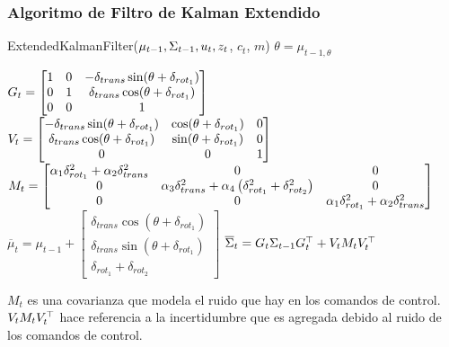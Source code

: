 \begin{frame}
	\frametitle{Algoritmo de Filtro de Kalman Extendido}
    \footnotesize
 	\begin{algorithmic}[1]
		\State ExtendedKalmanFilter({$\mu_{t-1}, \Sigma_{t-1}, u_{t}, z_{t}$, $c_{t}$, $m$})
		\State $\theta = \mu_{t-1,\theta}$
		
		\State $
			G_{t} = 
			\begin{bmatrix}
				1 & 0 & -\delta_{trans} \sin(\theta + \delta_{rot_{1}})\\
				0 & 1 & \delta_{trans} \cos(\theta + \delta_{rot_{1}})\\
				0 & 0 & 1\\
			\end{bmatrix}
			   $
		\State $
			V_{t} = 
			\begin{bmatrix}
				-\delta_{trans} \sin(\theta + \delta_{rot_{1}}) & \cos(\theta + \delta_{rot_{1}}) & 0\\
				\delta_{trans} \cos(\theta + \delta_{rot_{1}}) & \sin(\theta + \delta_{rot_{1}}) & 0\\
				0 & 0 & 1\\
			\end{bmatrix}
         	   $
		\State $
			M_{t} = 
			\begin{bmatrix}
				\alpha_{1}\delta^{2}_{rot_{1}} + \alpha_{2}\delta^{2}_{trans} & 0 & 0\\
				0 & \alpha_{3} \delta^{2}_{trans} + \alpha_{4} \left( \delta^{2}_{rot_{1}} + \delta^{2}_{rot_{2}} \right) & 0\\
				0 & 0 & \alpha_{1}\delta^{2}_{rot_{1}} + \alpha_{2}\delta^{2}_{trans}\\
			\end{bmatrix}
			  $
		\State $\overline{\mu}_{t} = \mu_{t-1} + 
			\begin{bmatrix}
			\delta_{trans}\cos(\theta+\delta_{rot_{1}}) \\
			\delta_{trans}\sin(\theta+\delta_{rot_{1}}) \\
			\delta_{rot_{1}} + \delta_{rot_{2}}
		\end{bmatrix}$
		\State $\overline{\Sigma}_{t} = G_{t} \Sigma_{t-1} G_{t}^{\top}+V_{t} M_{t} V_{t}^{\top}$ 
	\end{algorithmic}
    \vspace{1em}
    $M_{t}$ es una covarianza que modela el ruido que hay en los comandos de control.
    $V_{t} M_{t} V_{t}^{\top}$ hace referencia a la incertidumbre que es agregada debido al ruido de los comandos de control.
	
\end{frame}

